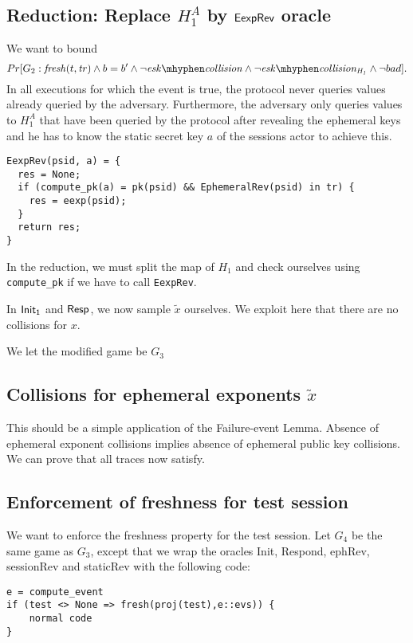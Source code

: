 \documentclass[]{article}
\begin{document}
\subsection{Reduction: Replace $H_1^A$ by $\mathsf{EexpRev}$ oracle}

We want to bound
\[
  Pr[G_2 : \fresh(t, \tr) \land b = b' \land \neg \eskColl \land \neg \eskHColl \land \neg bad].
\]
In all executions for which the event is true, the protocol never queries values already queried
  by the adversary.
Furthermore, the adversary only queries values to $H_1^A$ that have been queried by the protocol
  after revealing the ephemeral keys and he has to know the static secret key $a$ of the
  sessions actor to achieve this.

\begin{verbatim}
EexpRev(psid, a) = {
  res = None;
  if (compute_pk(a) = pk(psid) && EphemeralRev(psid) in tr) {
    res = eexp(psid);
  }
  return res;
}
\end{verbatim}
%
In the reduction, we must split the map of $H_1$ and check ourselves using \verb+compute_pk+
  if we have to call \verb+EexpRev+.

In $\mathsf{Init_1}$ and $\mathsf{Resp}$, we now sample $\tilde{x}$ ourselves. We exploit here that there are no
  collisions for $x$.

We let the modified game be $G_3$

\subsection{Collisions for ephemeral exponents $\tilde{x}$}

This should be a simple application of the Failure-event Lemma.
Absence of ephemeral exponent collisions implies absence of
  ephemeral public key collisions.
We can prove that all traces now satisfy.

\noindent
{}
  
\subsection{Enforcement of freshness for test session}
We want to enforce the freshness property for the test session. Let $G_4$ be the same game
as $G_3$, except that we wrap the oracles Init, Respond, ephRev, sessionRev and staticRev
with the following code:
\begin{verbatim}
e = compute_event
if (test <> None => fresh(proj(test),e::evs)) {
	normal code
}
\end{verbatim}
\end{document}
